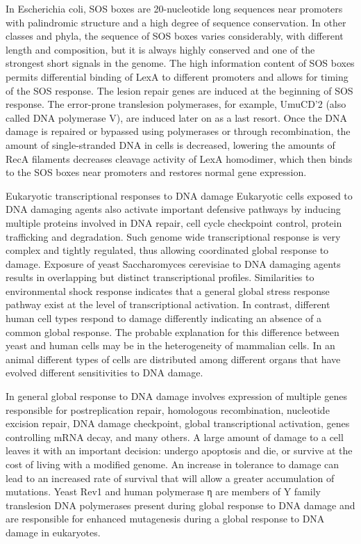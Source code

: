 In Escherichia coli, SOS boxes are 20-nucleotide long sequences near promoters with palindromic structure and a high degree of sequence conservation. In other classes and phyla, the sequence of SOS boxes varies considerably, with different length and composition, but it is always highly conserved and one of the strongest short signals in the genome. The high information content of SOS boxes permits differential binding of LexA to different promoters and allows for timing of the SOS response. The lesion repair genes are induced at the beginning of SOS response. The error-prone translesion polymerases, for example, UmuCD'2 (also called DNA polymerase V), are induced later on as a last resort. Once the DNA damage is repaired or bypassed using polymerases or through recombination, the amount of single-stranded DNA in cells is decreased, lowering the amounts of RecA filaments decreases cleavage activity of LexA homodimer, which then binds to the SOS boxes near promoters and restores normal gene expression.

Eukaryotic transcriptional responses to DNA damage
Eukaryotic cells exposed to DNA damaging agents also activate important defensive pathways by inducing multiple proteins involved in DNA repair, cell cycle checkpoint control, protein trafficking and degradation. Such genome wide transcriptional response is very complex and tightly regulated, thus allowing coordinated global response to damage. Exposure of yeast Saccharomyces cerevisiae to DNA damaging agents results in overlapping but distinct transcriptional profiles. Similarities to environmental shock response indicates that a general global stress response pathway exist at the level of transcriptional activation. In contrast, different human cell types respond to damage differently indicating an absence of a common global response. The probable explanation for this difference between yeast and human cells may be in the heterogeneity of mammalian cells. In an animal different types of cells are distributed among different organs that have evolved different sensitivities to DNA damage.

In general global response to DNA damage involves expression of multiple genes responsible for postreplication repair, homologous recombination, nucleotide excision repair, DNA damage checkpoint, global transcriptional activation, genes controlling mRNA decay, and many others. A large amount of damage to a cell leaves it with an important decision: undergo apoptosis and die, or survive at the cost of living with a modified genome. An increase in tolerance to damage can lead to an increased rate of survival that will allow a greater accumulation of mutations. Yeast Rev1 and human polymerase η are members of Y family translesion DNA polymerases present during global response to DNA damage and are responsible for enhanced mutagenesis during a global response to DNA damage in eukaryotes.

